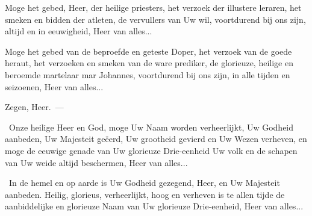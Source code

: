 \documentclass[12pt,twoside,a5paper]{article}
\begin{document}
\begin{halfparskip}
   Moge het gebed, Heer, der heilige priesters, het verzoek der illustere leraren, het smeken en bidden der atleten, de vervullers van Uw wil, voortdurend bij ons zijn, altijd en in eeuwigheid, Heer van alles...

   Moge het gebed van de beproefde en geteste Doper, het verzoek van de goede heraut, het verzoeken en smeken van de ware prediker, de glorieuze, heilige en beroemde martelaar mar Johannes, voortdurend bij ons zijn, in alle tijden en seizoenen, Heer van alles...
\end{halfparskip}



\begin{halfparskip}
  Zegen, Heer.~---  

  \cc~Onze heilige Heer en God, moge Uw Naam worden verheerlijkt, Uw Godheid aanbeden, Uw Majesteit geëerd, Uw grootheid gevierd en Uw Wezen verheven, en moge de eeuwige genade van Uw glorieuze Drie-eenheid Uw volk en de schapen van Uw weide altijd beschermen, Heer van alles...

  \cc~In de hemel en op aarde is Uw Godheid gezegend, Heer, en Uw Majesteit aanbeden. Heilig, glorieus, verheerlijkt, hoog en verheven is te allen tijde de aanbiddelijke en glorieuze Naam van Uw glorieuze Drie-eenheid, Heer van alles...
\end{halfparskip}
\end{document}
